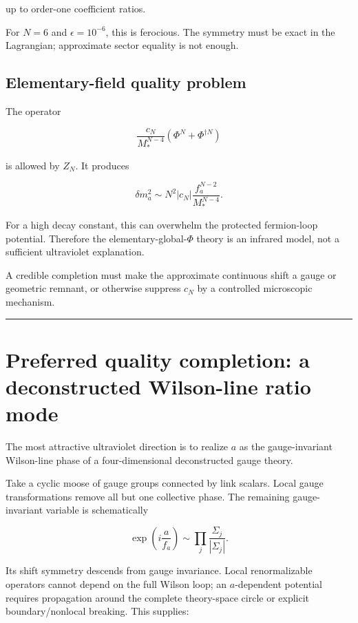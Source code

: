 \documentclass[11pt,a4paper]{article}
\begin{document}
up to order-one coefficient ratios.

For \(N=6\) and \(\epsilon=10^{-6}\), this is ferocious. The symmetry
must be exact in the Lagrangian; approximate sector equality is not
enough.

\subsection{Elementary-field quality
problem}\label{elementary-field-quality-problem}

The operator

\[
\frac{c_N}{M_*^{N-4}}
\left(\Phi^N+\Phi^{\dagger N}\right)
\]

is allowed by \(Z_N\). It produces

\[
\delta m_a^2
\sim
N^2|c_N|
\frac{f_a^{N-2}}{M_*^{N-4}}.
\]

For a high decay constant, this can overwhelm the protected fermion-loop
potential. Therefore the elementary-global-\(\Phi\) theory is an
infrared model, not a sufficient ultraviolet explanation.

A credible completion must make the approximate continuous shift a gauge
or geometric remnant, or otherwise suppress \(c_N\) by a controlled
microscopic mechanism.

\begin{center}\rule{0.5\linewidth}{0.5pt}\end{center}

\section{Preferred quality completion: a deconstructed Wilson-line ratio
mode}\label{preferred-quality-completion-a-deconstructed-wilson-line-ratio-mode}

The most attractive ultraviolet direction is to realize \(a\) as the
gauge-invariant Wilson-line phase of a four-dimensional deconstructed
gauge theory.

Take a cyclic moose of gauge groups connected by link scalars. Local
gauge transformations remove all but one collective phase. The remaining
gauge-invariant variable is schematically

\[
\exp\left(i\frac a{f_a}\right)
\sim
\prod_j\frac{\Sigma_j}{|\Sigma_j|}.
\]

Its shift symmetry descends from gauge invariance. Local renormalizable
operators cannot depend on the full Wilson loop; an \(a\)-dependent
potential requires propagation around the complete theory-space circle
or explicit boundary/nonlocal breaking. This supplies:
\end{document}
